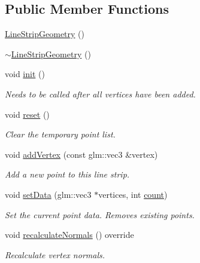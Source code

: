 \subsection*{Public Member Functions}
\begin{DoxyCompactItemize}
\item 
\mbox{\hyperlink{classec_1_1_line_strip_geometry_ad93597cb912f407b6e7be3f3d377cc4d}{Line\+Strip\+Geometry}} ()
\item 
\mbox{\hyperlink{classec_1_1_line_strip_geometry_a2fcbc3ebbd2318f00da14dbf7a2c87f3}{$\sim$\+Line\+Strip\+Geometry}} ()
\item 
void \mbox{\hyperlink{classec_1_1_line_strip_geometry_a8dac12c33ec187961ba4ac1573d718a5}{init}} ()
\begin{DoxyCompactList}\small\item\em Needs to be called after all vertices have been added. \end{DoxyCompactList}\item 
void \mbox{\hyperlink{classec_1_1_line_strip_geometry_abaf125f40af2b979e4b3af3939bb0a0e}{reset}} ()
\begin{DoxyCompactList}\small\item\em Clear the temporary point list. \end{DoxyCompactList}\item 
void \mbox{\hyperlink{classec_1_1_line_strip_geometry_a185da594a28585dabc17874a59cfe7ef}{add\+Vertex}} (const glm\+::vec3 \&vertex)
\begin{DoxyCompactList}\small\item\em Add a new point to this line strip. \end{DoxyCompactList}\item 
void \mbox{\hyperlink{classec_1_1_line_strip_geometry_a2649268027055ff190efb0efdc5768a4}{set\+Data}} (glm\+::vec3 $\ast$vertices, int \mbox{\hyperlink{namespaceec_a30e2a743ebdeb02ac68a6cfa50f629c7ae2942a04780e223b215eb8b663cf5353}{count}})
\begin{DoxyCompactList}\small\item\em Set the current point data. Removes existing points. \end{DoxyCompactList}\item 
void \mbox{\hyperlink{classec_1_1_line_strip_geometry_a8b78bf56551a9536f5a2dace78ce4fcd}{recalculate\+Normals}} () override
\begin{DoxyCompactList}\small\item\em Recalculate vertex normals. \end{DoxyCompactList}\end{DoxyCompactItemize}
